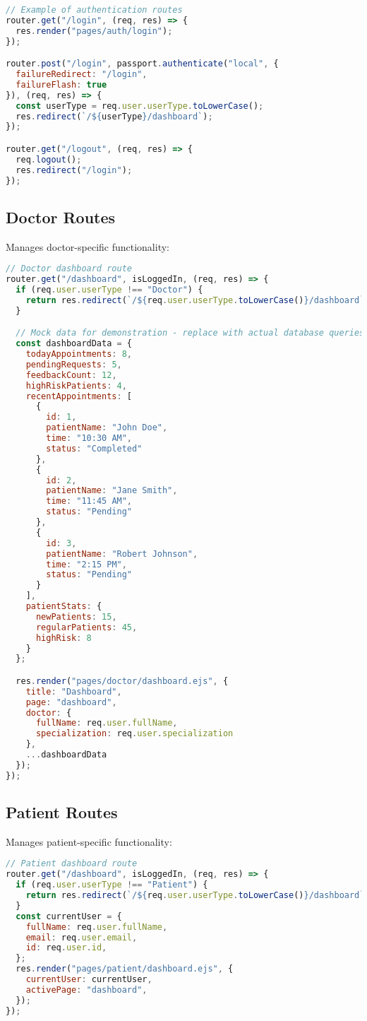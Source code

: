\documentclass[12pt,a4paper]{report}
\begin{document}
\begin{lstlisting}[language=JavaScript]
// Example of authentication routes
router.get("/login", (req, res) => {
  res.render("pages/auth/login");
});

router.post("/login", passport.authenticate("local", {
  failureRedirect: "/login",
  failureFlash: true
}), (req, res) => {
  const userType = req.user.userType.toLowerCase();
  res.redirect(`/${userType}/dashboard`);
});

router.get("/logout", (req, res) => {
  req.logout();
  res.redirect("/login");
});
\end{lstlisting}

\subsection{Doctor Routes}
Manages doctor-specific functionality:

\begin{lstlisting}[language=JavaScript]
// Doctor dashboard route
router.get("/dashboard", isLoggedIn, (req, res) => {
  if (req.user.userType !== "Doctor") {
    return res.redirect(`/${req.user.userType.toLowerCase()}/dashboard`);
  }

  // Mock data for demonstration - replace with actual database queries
  const dashboardData = {
    todayAppointments: 8,
    pendingRequests: 5,
    feedbackCount: 12,
    highRiskPatients: 4,
    recentAppointments: [
      {
        id: 1,
        patientName: "John Doe",
        time: "10:30 AM",
        status: "Completed"
      },
      {
        id: 2,
        patientName: "Jane Smith",
        time: "11:45 AM",
        status: "Pending"
      },
      {
        id: 3,
        patientName: "Robert Johnson",
        time: "2:15 PM",
        status: "Pending"
      }
    ],
    patientStats: {
      newPatients: 15,
      regularPatients: 45,
      highRisk: 8
    }
  };

  res.render("pages/doctor/dashboard.ejs", { 
    title: "Dashboard",
    page: "dashboard",
    doctor: {
      fullName: req.user.fullName,
      specialization: req.user.specialization
    },
    ...dashboardData
  });
});
\end{lstlisting}

\subsection{Patient Routes}
Manages patient-specific functionality:

\begin{lstlisting}[language=JavaScript]
// Patient dashboard route
router.get("/dashboard", isLoggedIn, (req, res) => {
  if (req.user.userType !== "Patient") {
    return res.redirect(`/${req.user.userType.toLowerCase()}/dashboard`);
  }
  const currentUser = {
    fullName: req.user.fullName,
    email: req.user.email,
    id: req.user.id,
  };
  res.render("pages/patient/dashboard.ejs", {
    currentUser: currentUser,
    activePage: "dashboard",
  });
});
\end{lstlisting}
\end{document}
